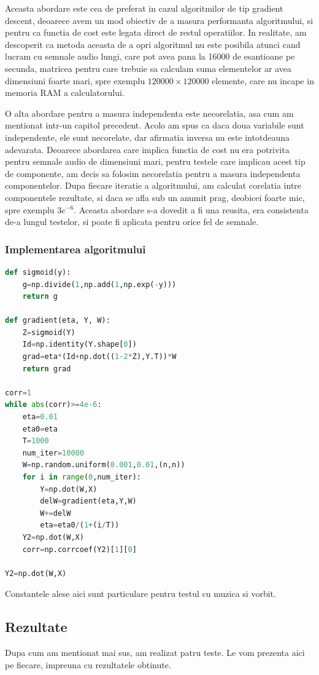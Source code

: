 \documentclass[12pt,oneside]{article}
\begin{document}
Aceasta abordare este cea de preferat in cazul algoritmilor de tip gradient descent, deoarece avem un mod obiectiv de a masura performanta algoritmului, si pentru ca functia de cost este legata direct de restul operatiilor. In realitate, am descoperit ca metoda aceasta de a opri algoritmul nu este posibila atunci cand lucram cu semnale audio lungi, care pot avea pana la 16000 de esantioane pe secunda, matricea pentru care trebuie sa calculam suma elementelor ar avea dimensiuni foarte mari, spre exemplu $120000 \times 120000$ elemente, care nu incape in memoria RAM a calculatorului. 

O alta abordare pentru a masura independenta este necorelatia, asa cum am mentionat intr-un capitol precedent. Acolo am spus ca daca doua variabile sunt independente, ele sunt necorelate, dar afirmatia inversa nu este intotdeauna adevarata. Deoarece abordarea care implica functia de cost nu era potrivita pentru semnale audio de dimensiuni mari, pentru testele care implicau acest tip de componente, am decis sa folosim necorelatia pentru a masura independenta componentelor. Dupa fiecare iteratie a algoritmului, am calculat corelatia intre componentele rezultate, si daca se afla sub un anumit prag, deobicei foarte mic, spre exemplu $3e^{-6}$. Aceasta abordare s-a dovedit a fi una reusita, era consistenta de-a lungul testelor, si poate fi aplicata pentru orice fel de semnale. 

\subsubsection{Implementarea algoritmului}
\begin{lstlisting}[language=Python]
def sigmoid(y):
    g=np.divide(1,np.add(1,np.exp(-y)))
    return g

def gradient(eta, Y, W):
    Z=sigmoid(Y)
    Id=np.identity(Y.shape[0])
    grad=eta*(Id+np.dot((1-2*Z),Y.T))*W
	return grad

corr=1
while abs(corr)>=4e-6:
	eta=0.01
	eta0=eta
	T=1000
	num_iter=10000
	W=np.random.uniform(0.001,0.01,(n,n))
	for i in range(0,num_iter):
		Y=np.dot(W,X)
		delW=gradient(eta,Y,W)
		W+=delW
		eta=eta0/(1+(i/T))
	Y2=np.dot(W,X)
	corr=np.corrcoef(Y2)[1][0]

Y2=np.dot(W,X)
\end{lstlisting}
Constantele alese aici sunt particulare pentru testul cu muzica si vorbit.

\newpage
\subsection{Rezultate}
Dupa cum am mentionat mai sus, am realizat patru teste. Le vom prezenta aici pe fiecare, impreuna cu rezultatele obtinute.
\end{document}
